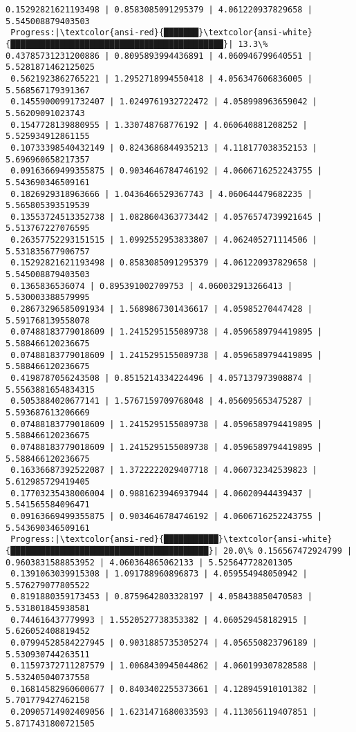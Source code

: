 \documentclass[11pt]{article}
\begin{document}
\begin{Verbatim}[commandchars=\\\{\}]
 0.15292821621193498 | 0.8583085091295379 | 4.061220937829658 | 5.545008879403503
 Progress:|\textcolor{ansi-red}{███████}\textcolor{ansi-white}{███████████████████████████████████████████}| 13.3\% 0.43785731231200886 | 0.8095893994436891 | 4.060946799640551 | 5.5281871462125025
 0.5621923862765221 | 1.2952718994550418 | 4.056347606836005 | 5.568567179391367
 0.14559000991732407 | 1.0249761932722472 | 4.058998963659042 | 5.56209091023743
 0.1547728139880955 | 1.330748768776192 | 4.060640881208252 | 5.525934912861155
 0.10733398540432149 | 0.8243686844935213 | 4.118177038352153 | 5.696960658217357
 0.09163669499355875 | 0.9034646784746192 | 4.0606716252243755 | 5.543690346509161
 0.1826929318963666 | 1.0436466529367743 | 4.060644479682235 | 5.565805393519539
 0.13553724513352738 | 1.0828604363773442 | 4.0576574739921645 | 5.513767227076595
 0.26357752293151515 | 1.0992552953833807 | 4.062405271114506 | 5.531835677906757
 0.15292821621193498 | 0.8583085091295379 | 4.061220937829658 | 5.545008879403503
 0.1365836536074 | 0.895391002709753 | 4.060032913266413 | 5.530003388579995
 0.28673296585091934 | 1.5689867301436617 | 4.05985270447428 | 5.591768139558078
 0.07488183779018609 | 1.2415295155089738 | 4.0596589794419895 | 5.588466120236675
 0.07488183779018609 | 1.2415295155089738 | 4.0596589794419895 | 5.588466120236675
 0.4198787056243508 | 0.8515214334224496 | 4.057137973908874 | 5.5563881654834315
 0.5053884020677141 | 1.5767159709768048 | 4.056095653475287 | 5.593687613206669
 0.07488183779018609 | 1.2415295155089738 | 4.0596589794419895 | 5.588466120236675
 0.07488183779018609 | 1.2415295155089738 | 4.0596589794419895 | 5.588466120236675
 0.16336687392522087 | 1.3722222029407718 | 4.060732342539823 | 5.612985729419405
 0.17703235438006004 | 0.9881623946937944 | 4.06020944439437 | 5.541565584096471
 0.09163669499355875 | 0.9034646784746192 | 4.0606716252243755 | 5.543690346509161
 Progress:|\textcolor{ansi-red}{███████████}\textcolor{ansi-white}{████████████████████████████████████████}| 20.0\% 0.156567472924799 | 0.9603831588853952 | 4.060364865062133 | 5.525647728201305
 0.1391063039915308 | 1.091788960896873 | 4.059554948050942 | 5.576279077805522
 0.8191880359173453 | 0.8759642803328197 | 4.058438850470583 | 5.531801845938581
 0.744616437779993 | 1.5520527738353382 | 4.060529458182915 | 5.626052408819452
 0.07994528584227945 | 0.9031885735305274 | 4.056550823796189 | 5.530930744263511
 0.11597372711287579 | 1.0068430945044862 | 4.060199307828588 | 5.532405040737558
 0.16814582960600677 | 0.8403402255373661 | 4.128945910101382 | 5.701779427462158
 0.20905714902409056 | 1.6231471680033593 | 4.113056119407851 | 5.8717431800721505

\end{Verbatim}
\end{document}
